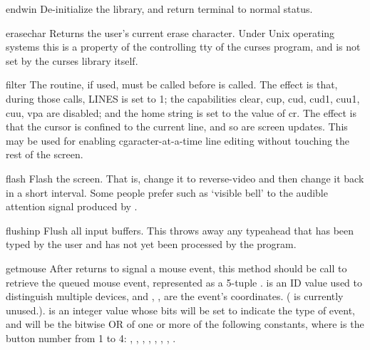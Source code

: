 \begin{funcdesc}{endwin}{}
De-initialize the library, and return terminal to normal status.
\end{funcdesc}

\begin{funcdesc}{erasechar}{}
Returns the user's current erase character.  Under Unix operating
systems this is a property of the controlling tty of the curses
program, and is not set by the curses library itself.
\end{funcdesc}

\begin{funcdesc}{filter}{}
The  routine, if used, must be called before
 is  called.  The effect is that, during those
calls, LINES is set to 1; the capabilities clear, cup, cud, cud1,
cuu1, cuu, vpa are disabled; and the home string is set to the value of cr.
The effect is that the cursor is confined to the current line, and so
are screen updates.  This may be used for enabling cgaracter-at-a-time 
line editing without touching the rest of the screen.
\end{funcdesc}

\begin{funcdesc}{flash}{}
Flash the screen.  That is, change it to reverse-video and then change
it back in a short interval.  Some people prefer such as `visible bell'
to the audible attention signal produced by .
\end{funcdesc}

\begin{funcdesc}{flushinp}{}
Flush all input buffers.  This throws away any  typeahead  that  has
been typed by the user and has not yet been processed by the program.
\end{funcdesc}

\begin{funcdesc}{getmouse}{}
After  returns  to signal a mouse
event, this method should be call to retrieve the queued mouse event,
represented as a 5-tuple
.
 is an ID value used to distinguish multiple devices,
and , ,  are the event's coordinates.  (
is currently unused.).   is an integer value whose bits
will be set to indicate the type of event, and will be the bitwise OR
of one or more of the following constants, where  is the button
number from 1 to 4:
,
,
,
,
,
,
,
.
\end{funcdesc}

